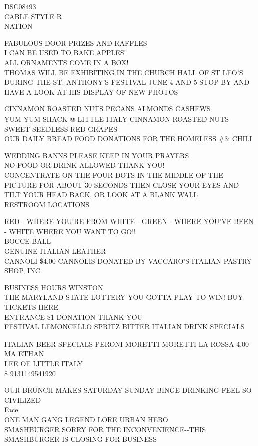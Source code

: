 \documentclass[10pt,letterpaper]{article}
\begin{document}
DSC08493\\
CABLE STYLE R\\
NATION

FABULOUS DOOR PRIZES AND RAFFLES\\
I CAN BE USED TO BAKE APPLES!\\
ALL ORNAMENTS COME IN A BOX!\\
THOMAS WILL BE EXHIBITING IN THE CHURCH HALL OF ST LEO'S DURING THE ST. ANTHONY'S FESTIVAL JUNE 4 AND 5 STOP BY AND HAVE A LOOK AT HIS DISPLAY OF NEW PHOTOS

CINNAMON ROASTED NUTS PECANS ALMONDS CASHEWS\\
YUM YUM SHACK @ LITTLE ITALY CINNAMON ROASTED NUTS\\
SWEET SEEDLESS RED GRAPES\\
OUR DAILY BREAD FOOD DONATIONS FOR THE HOMELESS \#3: CHILI

WEDDING BANNS PLEASE KEEP IN YOUR PRAYERS\\
NO FOOD OR DRINK ALLOWED THANK YOU!\\
CONCENTRATE ON THE FOUR DOTS IN THE MIDDLE OF THE PICTURE FOR ABOUT 30 SECONDS THEN CLOSE YOUR EYES AND TILT YOUR HEAD BACK, OR LOOK AT A BLANK WALL\\
RESTROOM LOCATIONS

RED {-} WHERE YOU'RE FROM WHITE {-} GREEN {-} WHERE YOU'VE BEEN {-} WHITE WHERE YOU WANT TO GO!!\\
BOCCE BALL\\
GENUINE ITALIAN LEATHER\\
CANNOLI \$4.00 CANNOLIS DONATED BY VACCARO'S ITALIAN PASTRY SHOP, INC.

BUSINESS HOURS WINSTON\\
THE MARYLAND STATE LOTTERY YOU GOTTA PLAY TO WIN!  BUY TICKETS HERE\\
ENTRANCE \$1 DONATION THANK YOU\\
FESTIVAL LEMONCELLO SPRITZ BITTER ITALIAN DRINK SPECIALS

ITALIAN BEER SPECIALS PERONI MORETTI MORETTI LA ROSSA 4.00\\
MA ETHAN\\
LEE OF LITTLE ITALY\\
8 9131149541920

OUR BRUNCH MAKES SATURDAY SUNDAY BINGE DRINKING FEEL SO CIVILIZED\\
Face\\
ONE MAN GANG LEGEND LORE URBAN HERO\\
SMASHBURGER SORRY FOR THE INCONVENIENCE{-}{-}THIS SMASHBURGER IS CLOSING FOR BUSINESS
\end{document}
